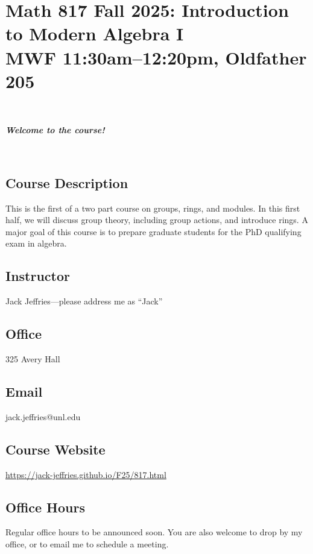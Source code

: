 \documentclass[12pt]{amsart}
\newcommand{\showsol}[1]{\def\displaysol{#1}}
\begin{document}
\showsol{0}
	
	\thispagestyle{empty}
	
	\section*{{\large Math 817 Fall 2025: Introduction to Modern Algebra I}\\ MWF 11:30am--12:20pm, Oldfather 205}
	
	\
	
	\begin{center}{ \textit{\textbf{Welcome to the course!}}}\end{center}
	
	\
	
		\subsection*{Course Description}

This is the first of a two part course on groups, rings, and modules. In this first half, we will discuss group theory, including group actions, and introduce rings. A major goal of this course is to prepare graduate students for the PhD qualifying exam in algebra.

	

	\subsection*{Instructor}  Jack Jeffries---please address me as ``Jack''
	


	\subsection*{Office}  325 Avery Hall

	\subsection*{Email}   jack.jeffries@unl.edu
	
	\subsection*{Course Website} \href{https://jack-jeffries.github.io/F25/817.html}{https://jack-jeffries.github.io/F25/817.html}

	\subsection*{Office Hours}  Regular office hours to be announced soon. You are also welcome to drop by my office, or to email me to schedule a meeting. 
\end{document}
